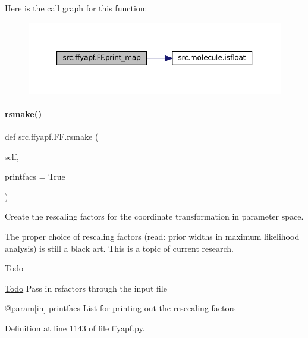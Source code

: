 Here is the call graph for this function\+:
\nopagebreak
\begin{figure}[H]
\begin{center}
\leavevmode
\includegraphics[width=350pt]{classsrc_1_1ffyapf_1_1FF_a1f2342882083a5b59d8d76d13d6f666d_cgraph}
\end{center}
\end{figure}
\mbox{\label{classsrc_1_1ffyapf_1_1FF_a392d73844890c87025d9a5ee2e24dc80}} 
\paragraph{\texorpdfstring{rsmake()}{rsmake()}}
{\footnotesize\ttfamily def src.\+ffyapf.\+F\+F.\+rsmake (\begin{DoxyParamCaption}\item[{}]{self,  }\item[{}]{printfacs = {\ttfamily True} }\end{DoxyParamCaption})}



Create the rescaling factors for the coordinate transformation in parameter space. 

The proper choice of rescaling factors (read\+: prior widths in maximum likelihood analysis) is still a black art. This is a topic of current research.

\begin{DoxyRefDesc}{Todo}
\item[\hyperlink{todo__todo000004}{Todo}]Pass in rsfactors through the input file\end{DoxyRefDesc}
\begin{DoxyVerb}     @param[in] printfacs List for printing out the resecaling factors\end{DoxyVerb}
 

Definition at line 1143 of file ffyapf.\+py.

